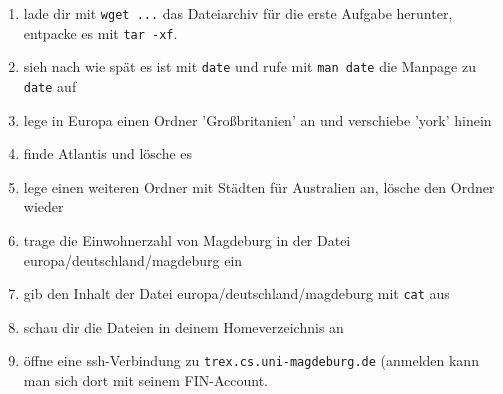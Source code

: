 \begin{enumerate}
\item lade dir mit \lstinline$wget ...$ das Dateiarchiv für die erste Aufgabe herunter, entpacke es mit \lstinline$tar -xf$.
\item sieh nach wie spät es ist mit \lstinline$date$ und rufe mit \lstinline$man date$ die Manpage zu \lstinline$date$ auf
\item lege in Europa einen Ordner 'Großbritanien' an und verschiebe 'york' hinein
\item finde Atlantis und lösche es
\item lege einen weiteren Ordner mit Städten für Australien an, lösche den Ordner wieder
\item trage die Einwohnerzahl von Magdeburg in der Datei europa/deutschland/magdeburg ein
\item gib den Inhalt der Datei europa/deutschland/magdeburg mit \lstinline$cat$ aus
\item schau dir die Dateien in deinem Homeverzeichnis an
\item öffne eine ssh-Verbindung zu \lstinline$trex.cs.uni-magdeburg.de$ (anmelden kann man sich dort mit seinem FIN-Account.
\end{enumerate}
